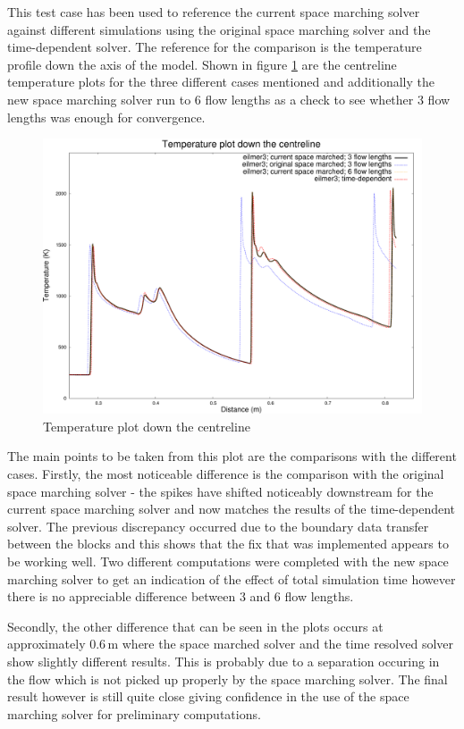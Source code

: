 This test case has been used to reference the current space marching solver against different simulations using the original space marching solver and the time-dependent solver. The reference for the comparison is the temperature profile down the axis of the model. Shown in figure \ref{fig:T_plot} are the centreline temperature plots for the three different cases mentioned and additionally the new space marching solver run to 6 flow lengths as a check to see whether 3 flow lengths was enough for convergence.

\begin{figure}[h]
 \centering
 \includegraphics[width=0.9\linewidth]{./chap3-axi-scramjet/T_profile_centreline.pdf}
 \caption{Temperature plot down the centreline}
 \label{fig:T_plot}
\end{figure}

The main points to be taken from this plot are the comparisons with the different cases. Firstly, the most noticeable difference is the comparison with the original space marching solver - the spikes have shifted noticeably downstream for the current space marching solver and now matches the results of the time-dependent solver. The previous discrepancy occurred due to the boundary data transfer between the blocks and this shows that the fix that was implemented appears to be working well. Two different computations were completed with the new space marching solver to get an indication of the effect of total simulation time however there is no appreciable difference between 3 and 6 flow lengths. 

Secondly, the other difference that can be seen in the plots occurs at approximately 0.6\,m where the space marched solver and the time resolved solver show slightly different results. This is probably due to a separation occuring in the flow which is not picked up properly by the space marching solver. The final result however is still quite close giving confidence in the use of the space marching solver for preliminary computations.